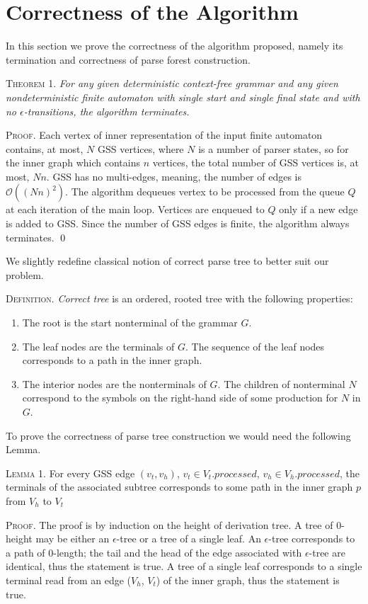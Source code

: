 \section{Correctness of the Algorithm}
In this section we prove the correctness of the algorithm proposed, namely its termination 
and correctness of parse forest construction.

\textsc{Theorem 1.}
\textit{For any given deterministic context-free grammar and any given nondeterministic
finite automaton with single start and single final state and with no $\epsilon$-transitions,
the algorithm terminates.}

\textsc{Proof.}
Each vertex of inner representation of the input finite automaton contains, at most, 
$N$ GSS vertices, where $N$ is a number of parser states, so for the inner graph which contains $n$
vertices, the total number of GSS vertices is, at most, $Nn$. GSS has no multi-edges,  
meaning, the number of edges is $\mathcal{O}((Nn)^2)$. 
The algorithm dequeues vertex to be processed from the queue $Q$ at each iteration of the 
main loop. Vertices are enqueued to $Q$ only if a new edge is added to GSS. Since the number of 
GSS edges is finite, the algorithm always terminates. \qed

We slightly redefine classical notion of correct parse tree to better suit our problem.

\textsc{Definition.} 
\emph{Correct tree} is an ordered, rooted tree with the following properties:
\begin{enumerate}
  \item The root is the start nonterminal of the grammar $G$.
  \item The leaf nodes are the terminals of $G$. The sequence of the leaf nodes 
        corresponds to a path in the inner graph. 
  \item The interior nodes are the nonterminals of $G$. The children of nonterminal 
        $N$ correspond to the symbols on the right-hand side of some production for $N$ in $G$.
\end{enumerate}

To prove the correctness of parse tree construction we would need the following Lemma.

\textsc{Lemma 1.}
For every GSS edge $(v_{t}, v_{h})$, $v_{t} \in V_{t}.processed$, $v_{h} \in V_{h}.processed$, 
the terminals of the associated subtree corresponds to some path in the inner graph $p$ from $V_{h}$ to $V_{t}$

\textsc{Proof.}
The proof is by induction on the height of derivation tree. 
A tree of 0-height may be either an $\epsilon$-tree or a tree of a single leaf.
An $\epsilon$-tree corresponds to a path of 0-length; the tail and the head of the edge associated with 
$\epsilon$-tree are identical, thus the statement is true. A tree of a single leaf corresponds to a single 
terminal read from an edge ($V_{h}$, $V_{t}$) of the inner graph, thus the statement is true.

